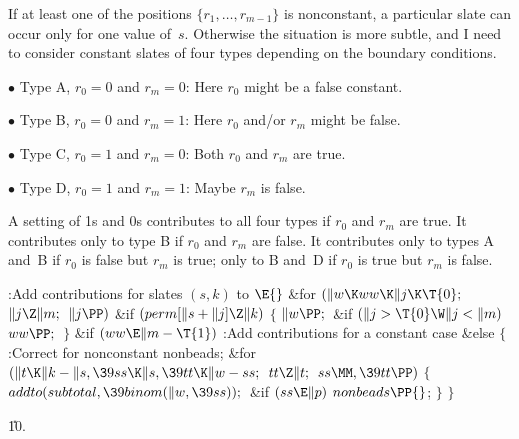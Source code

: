 If at least one of the positions $\{r_1,\ldots,r_{m-1}\}$ is nonconstant,
a particular slate can occur only for one value of~$s$. Otherwise the
situation is more subtle, and I need to consider constant slates
of four types depending on the boundary conditions.

\smallskip
$\bullet$ Type A, $r_0=0$ and $r_m=0$: Here $r_0$ might be a false constant.

$\bullet$ Type B, $r_0=0$ and $r_m=1$: Here $r_0$ and/or $r_m$ might be false.

$\bullet$ Type C, $r_0=1$ and $r_m=0$: Both $r_0$ and $r_m$ are true.

$\bullet$ Type D, $r_0=1$ and $r_m=1$: Maybe $r_m$ is false.

\smallskip\noindent
A setting of  1s and  0s contributes to all four types if
$r_0$
and $r_m$ are true. It contributes only to type B if $r_0$ and $r_m$
are false. It contributes only to types A and~B if $r_0$ is false but
$r_m$ is true; only to B and~D if $r_0$ is true but $r_m$ is false.

\Y\B\4:Add contributions for slates $(s,k)$ to \X${}\E{}$\6
\&{for} ${}(\|w\K\\{ww}\K\|j\K\T{0};{}$ ${}\|j\Z\|m;{}$ ${}\|j\PP){}$\1\6
\&{if} ${}(\\{perm}[\|s+\|j]\Z\|k){}$\5
${}\{{}$\1\6
${}\|w\PP;{}$\6
\&{if} ${}(\|j>\T{0}\W\|j<\|m){}$\1\5
${}\\{ww}\PP;{}$\2\6
\4${}\}{}$\2\2\6
\&{if} ${}(\\{ww}\E\|m-\T{1}){}$\1\5
:Add contributions for a constant case\X\2\6
\&{else}\5
${}\{{}$\1\6
:Correct for nonconstant nonbeads\X;\6
\&{for} ${}(\|t\K\|k-\|s,\39\\{ss}\K\|s,\39\\{tt}\K\|w-\\{ss};{}$ ${}\\{tt}\Z%
\|t;{}$ ${}\\{ss}\MM,\39\\{tt}\PP){}$\5
${}\{{}$\1\6
${}\\{addto}(\\{subtotal},\39\\{binom}(\|w,\39\\{ss}));{}$\6
\&{if} ${}(\\{ss}\E\|p){}$\1\5
${}\\{nonbeads}\PP{}$;\2\6
\4${}\}{}$\2\6
\4${}\}{}$\2\par
\U10.\fi


